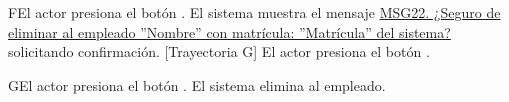 \begin{UCtrayectoriaA}{F}{El actor presiona el botón .}
    \UCpaso El sistema muestra el mensaje \hyperref[MSG22]{MSG22. ¿Seguro de eliminar al empleado ''Nombre'' con matrícula: ''Matrícula'' del sistema?} solicitando confirmación. [Trayectoria G]
    \UCpaso[\UCactor] El actor presiona el botón .
\end{UCtrayectoriaA}

\begin{UCtrayectoriaA}{G}{El actor presiona el botón .}
    \UCpaso     El sistema elimina al empleado.  
\end{UCtrayectoriaA}

